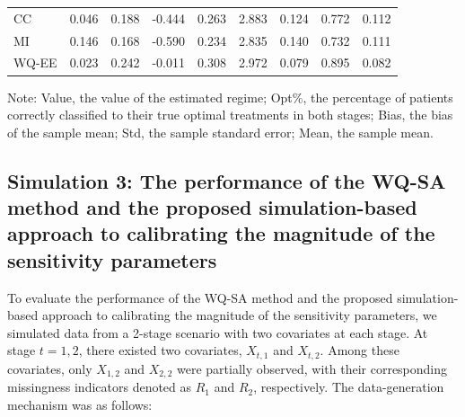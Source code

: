\documentclass[12pt]{article}
\begin{document}
\begin{table}[htbp]
\begin{threeparttable}
\begin{tabular}{lcccccccc}
CC & 0.046 & 0.188 & -0.444 & 0.263 & 2.883 & 0.124 & 0.772 & 0.112 \\
MI & 0.146 & 0.168 & -0.590 & 0.234 & 2.835 & 0.140 & 0.732 & 0.111 \\
WQ-EE & 0.023 & 0.242 & -0.011 & 0.308 & 2.972 & 0.079 & 0.895 & 0.082 \\
    \hline
    \end{tabular}%
\begin{tablenotes}
    \small
    \item Note: Value, the value of the estimated regime; Opt\%, the percentage of patients correctly classified to their true optimal treatments in both stages; Bias, the bias of the sample mean; Std, the sample standard error; Mean, the sample mean.
\end{tablenotes}
\end{threeparttable}
\end{table}%



\subsection{Simulation 3: The performance of the WQ-SA method and the proposed simulation-based approach to calibrating the magnitude of the sensitivity parameters}

To evaluate the performance of the WQ-SA method and the proposed simulation-based approach to calibrating the magnitude of the sensitivity parameters, we simulated  data from a 2-stage scenario with two covariates at each stage. At stage $t = 1, 2$, there existed two covariates, $X_{t,1}$ and $X_{t,2}$. Among these covariates, only $X_{1,2}$ and $X_{2,2}$ were partially observed, with their corresponding missingness indicators denoted as $R_1$ and $R_2$, respectively. The data-generation mechanism was as follows:
\end{document}
